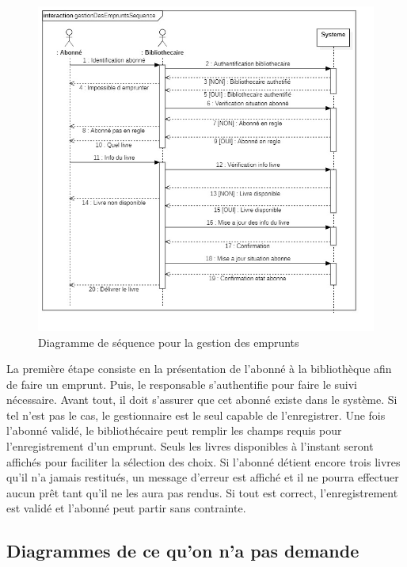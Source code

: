 \paragraph{}
\begin{figure}[h]
        \centering
        \includegraphics[width=1\textwidth]{gestionDesEmpruntsSequence}
        \caption{Diagramme de séquence pour la gestion des emprunts}
        \label{image-gestionDesEmpruntsSequence}
        \end{figure}
\par
La première étape consiste en la présentation de l'abonné à la bibliothèque afin de 
faire un emprunt. Puis, le responsable s'authentifie pour faire le suivi nécessaire. Avant 
tout, il doit s'assurer que cet abonné existe dans le système. Si tel n'est pas le cas, le 
gestionnaire est le seul capable de l'enregistrer. Une fois l'abonné validé, le 
bibliothécaire peut remplir les champs requis pour l'enregistrement d'un emprunt. Seuls 
les livres disponibles à l'instant seront affichés pour faciliter la sélection des choix.
Si l'abonné détient encore trois livres qu'il n'a jamais restitués, un message d'erreur 
est affiché et il ne pourra effectuer aucun prêt tant qu'il ne les aura pas rendus. Si 
tout est correct, l'enregistrement est validé et l'abonné peut partir sans contrainte.

\subsection{Diagrammes de ce qu'on n'a pas demande}

